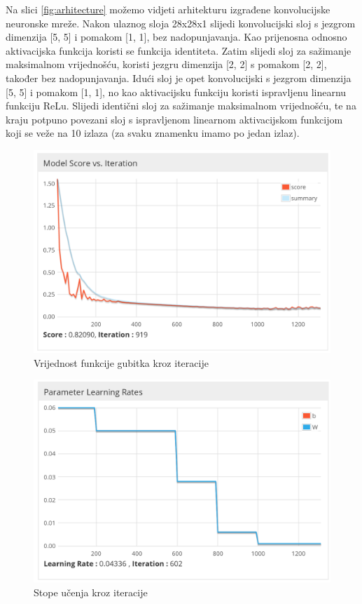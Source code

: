 \documentclass[times, utf8, diplomski]{fer}
\theoremstyle{definition}
\begin{document}
Na slici \ref{fig:arhitecture} možemo vidjeti arhitekturu izgrađene konvolucijske neuronske mreže. Nakon ulaznog sloja 28x28x1 slijedi konvolucijski sloj s jezgrom dimenzija [5, 5] i pomakom [1, 1], bez nadopunjavanja. Kao prijenosna odnosno aktivacijska funkcija koristi se funkcija identiteta. Zatim slijedi sloj za sažimanje maksimalnom vrijednošću, koristi jezgru dimenzija [2, 2] s pomakom [2, 2], također bez nadopunjavanja. Idući sloj je opet konvolucijski s jezgrom dimenzija [5, 5] i pomakom [1, 1], no kao aktivacijsku funkciju koristi ispravljenu linearnu funkciju ReLu. Slijedi identični sloj za sažimanje maksimalnom vrijednošću, te na kraju potpuno povezani sloj s ispravljenom linearnom aktivacijskom funkcijom koji se veže na 10 izlaza (za svaku znamenku imamo po jedan izlaz).

\begin{figure}[h]
\centering
\includegraphics[scale=0.3]{funkcija_gubitka.png}
\caption{Vrijednost funkcije gubitka kroz iteracije}
\end{figure}

\begin{figure}[h]
\centering
\includegraphics[scale=0.28]{learning_rate.png}
\caption{Stope učenja kroz iteracije}
\end{figure}
\end{document}
